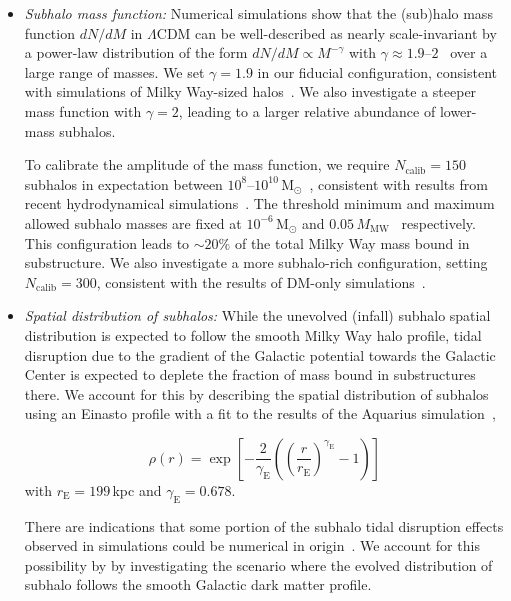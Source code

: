 \documentclass[prd,aps,10pt,nofootinbib,twocolumn,superscriptaddress,preprintnumbers,balancelastpage,longbibliography]{revtex4-1}
\begin{document}
\begin{itemize}
\item \emph{Subhalo mass function:} Numerical simulations show that the (sub)halo mass function $dN/dM$ in $\Lambda$CDM can be well-described as nearly scale-invariant by a power-law distribution of the form $dN/dM\propto M^{-\gamma}$ with $\gamma\approx1.9$--$2$~\cite{Moline:2016pbm} over a large range of masses. We set $\gamma=1.9$ in our fiducial configuration, consistent with simulations of Milky Way-sized halos~\cite{Madau:2008fr,Springel:2008cc}. We also investigate a steeper mass function with $\gamma=2$, leading to a larger relative abundance of lower-mass subhalos.

To calibrate the amplitude of the mass function, we require $N_\mathrm{calib}=150$ subhalos in expectation between $10^8$--$10^{10}$\,M$_\odot$~\cite{Hutten:2016jko}, consistent with results from recent hydrodynamical simulations~\cite{Mollitor:2014ara,Sawala:2015cdf}. The threshold minimum and maximum allowed subhalo masses are fixed at $10^{-6}$\,M$_\odot$ and $0.05\,M_\mathrm{MW}$~\cite{Hiroshima:2018kfv} respectively. This configuration leads to $\sim 20\%$ of the total Milky Way mass bound in substructure. We also investigate a more subhalo-rich configuration, setting $N_\mathrm{calib}=300$, consistent with the results of DM-only simulations~\cite{Springel:2008cc}.

\item \emph{Spatial distribution of subhalos:}  While the unevolved (infall) subhalo spatial distribution is expected to follow the smooth Milky Way halo profile, tidal disruption due to the gradient of the Galactic potential towards the Galactic Center is expected to deplete the fraction of mass bound in substructures there. We account for this by describing the spatial distribution of subhalos using an Einasto profile with a fit to the results of the Aquarius simulation~\cite{Springel:2008cc,Hutten:2016jko}, 

\begin{equation}
\rho(r) = \exp\left[-\frac{2}{\gamma_\mathrm{E}}\left(\left(\frac{r}{r_\mathrm{E}}\right)^{\gamma_\mathrm{E}} - 1\right)\right]
\end{equation}
with $r_\mathrm{E}=199$\,kpc and $\gamma_\mathrm{E}=0.678$.

There are indications that some portion of the subhalo tidal disruption effects observed in simulations could be numerical in origin~\cite{vandenBosch:2017ynq,vandenBosch:2018tyt}. We account for this possibility by by investigating the scenario where the evolved distribution of subhalo follows the smooth Galactic dark matter profile.


\end{itemize}
\end{document}
